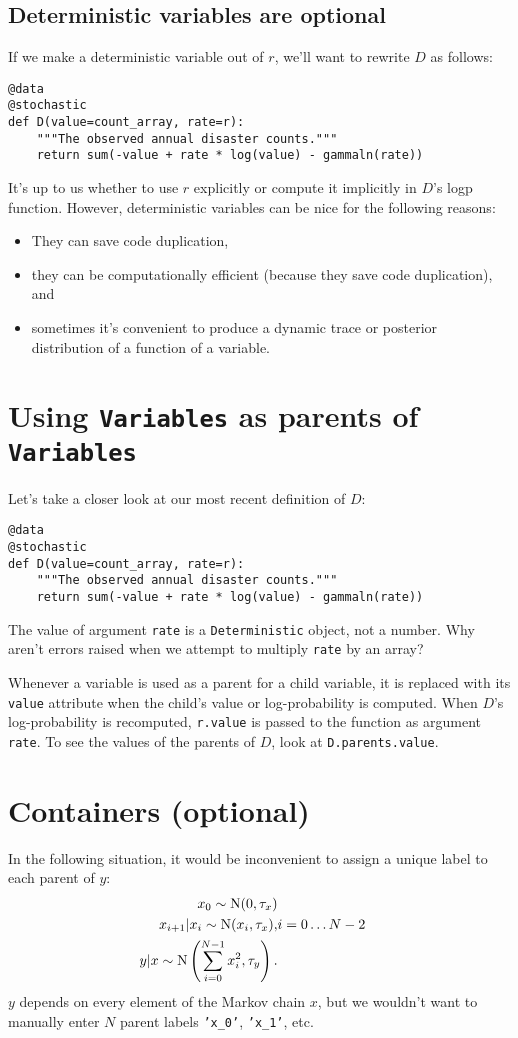 \subsection{Deterministic variables are optional}
If we make a deterministic variable out of $r$, we'll want to rewrite $D$ as follows:
\begin{verbatim}
@data
@stochastic
def D(value=count_array, rate=r):
    """The observed annual disaster counts."""
    return sum(-value + rate * log(value) - gammaln(rate))
\end{verbatim}
It's up to us whether to use $r$ explicitly or compute it implicitly in $D$'s logp function. However, deterministic variables can be nice for the following reasons:
\begin{itemize}
    \item They can save code duplication,    
    \item they can be computationally efficient (because they save code duplication), and
    \item sometimes it's convenient to produce a dynamic trace or posterior distribution of a function of a variable.
\end{itemize}

\section{Using \texttt{Variables} as parents of \texttt{Variables}}

Let's take a closer look at our most recent definition of $D$:
\begin{verbatim}
@data
@stochastic
def D(value=count_array, rate=r):
    """The observed annual disaster counts."""
    return sum(-value + rate * log(value) - gammaln(rate))
\end{verbatim}
The value of argument \texttt{rate} is a \texttt{Deterministic} object, not a number. Why aren't errors raised when we attempt to multiply \texttt{rate} by an array?

Whenever a variable is used as a parent for a child variable, it is replaced with its \texttt{value} attribute when the child's value or log-probability is computed. When $D$'s log-probability is recomputed, \texttt{r.value} is passed to the function as argument \texttt{rate}. To see the values of the parents of $D$, look at \texttt{D.parents.value}.

\section{Containers (optional)}\label{sub:container}
In the following situation, it would be inconvenient to assign a unique label to each parent of $y$:
\begin{eqnarray*}
    x_0 \sim \textup N(0,\tau_x)\\
    x_{i+1}|x_i\sim\textup{N}(x_i, \tau_x),& i=0\ldots N-2\\
    y|x \sim \textup N\left(\sum_{i=0}^{N-1}x_i^2,\tau_y\right).
\end{eqnarray*}
$y$ depends on every element of the Markov chain $x$, but we wouldn't want to manually enter $N$ parent labels \texttt{'x_0'}, \texttt{'x_1'}, etc.

